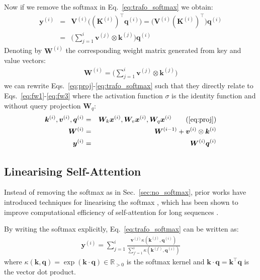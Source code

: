 \documentclass{article}
\def\vk{{\bm{k}}}
\def\vq{{\bm{q}}}
\def\vv{{\bm{v}}}
\def\vx{{\bm{x}}}
\def\vy{{\bm{y}}}
\def\mK{{\bm{K}}}
\def\mV{{\bm{V}}}
\def\mW{{\bm{W}}}
\theoremstyle{definition}
\begin{document}
Now if we remove the softmax in Eq.~\ref{eq:trafo_softmax} we obtain:
\begin{eqnarray}
\vy^{(i)} &=& \mV^{(i)} \big((\mK^{(i)})^{\top} \vq^{(i)}\big) = \big(\mV^{(i)} (\mK^{(i)})^{\top}\big) \vq^{(i)} \nonumber \\
&=& \big(\sum_{j=1}^{i} \vv^{(j)} \otimes \vk^{(j)}\big) \vq^{(i)}
\end{eqnarray}
Denoting by $\mW^{(i)}$ the corresponding weight matrix generated from key
and value vectors:
\begin{eqnarray}
\mW^{(i)} = \big(\sum_{j=1}^{i} \vv^{(j)}  \otimes \vk^{(j)} )
\end{eqnarray}
we can rewrite Eqs.~\ref{eq:proj}-\ref{eq:trafo_softmax}
such that they directly relate to Eqs.~\ref{eq:fw1}-\ref{eq:fw3} where the activation function
$\sigma$ is the identity function and without query projection $\mW_q$:
\begin{eqnarray}
\vk^{(i)}, \vv^{(i)}, \vq^{(i)} &=& \mW_k \vx^{(i)}, \mW_v \vx^{(i)}, \mW_q \vx^{(i)} \tag{\ref{eq:proj}} \\
\mW^{(i)}  &=& \mW^{(i-1)} + \vv^{(i)}  \otimes \vk^{(i)} \label{eq:fw_add} \\
\vy^{(i)}  &=& \mW^{(i)} \vq^{(i)} \label{eq:fw_get}
\end{eqnarray}

\subsection{Linearising Self-Attention}
\label{sec:linearAttention}
Instead of removing the softmax as in Sec.~\ref{sec:no_softmax},
prior works have introduced techniques for linearising the softmax \citep{tsai2019},
which has been shown to improve computational efficiency of self-attention for long sequences \citep{katharopoulos2020transformers, choromanski2020rethinking, peng2021random}.

By writing the softmax explicitly, Eq.~\ref{eq:trafo_softmax} can be written as:
\begin{align}
    \label{eq:softmax}
    \vy^{(i)} = \sum_{j=1}^i \frac{
         \vv^{(j)}  \kappa(\vk^{(j)}, \vq^{(i)})
         }{
         \sum_{j'=1}^i \kappa(\vk^{(j')}, \vq^{(i)})
         }
\end{align}
where $\kappa(\vk, \vq) = \exp(\vk \cdot \vq) \in \mathbb{R}_{>0}$ is the softmax kernel
and $\vk \cdot \vq = \vk^{\top}\vq$ is the vector dot product.
\end{document}
